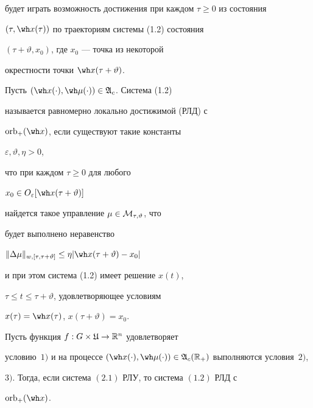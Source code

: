 будет играть возможность достижения при каждом $\tau\ge0$ из состояния


$(\tau,\wh x(\tau))$ по траекториям системы (1.2) состояния


$(\tau+\vartheta,x_0)$, где $x_0$ --- точка из некоторой


окрестности точки $\wh x(\tau+\vartheta)$.





\begin{defns}


Пусть $(\wh x(\cdot),\wh\mu(\cdot))\in\frak A_c$. Система (1.2)


называется равномерно локально достижимой (РЛД) с


$\orb_+(\wh x)$, если существуют такие константы


$\varepsilon,\vartheta,\eta>0$,


что при каждом $\tau\ge0$ для любого


$x_0\in O_\varepsilon[\wh x(\tau+\vartheta)]$


найдется такое управление $\mu\in\cal M_{\tau,\vartheta}$, что


будет выполнено неравенство


$\|\Delta\mu\|_{w,[\tau,\tau+\vartheta]}


\le\eta|\wh x(\tau+\vartheta)-x_0|$


и при этом система (1.2) имеет решение $x(t)$,


$\tau\le t\le\tau+\vartheta$, удовлетворяющее условиям


$x(\tau)=\wh x(\tau)$, $x(\tau+\vartheta)=x_0$.


\end{defns}





\begin{thms}


Пусть функция $f:G\times\frak U\to\Bbb R^n$ удовлетворяет


условию~$1)$ и на процессе $(\wh x(\cdot),\wh \mu(\cdot))


\in\frak A_c(\bR_+)$ выполняются условия~$2)$,


$3)$. Тогда, если система $(2.1)$ РЛУ, то система $(1.2)$ РЛД с


$\orb_+(\wh x)$.


\end{thms}





